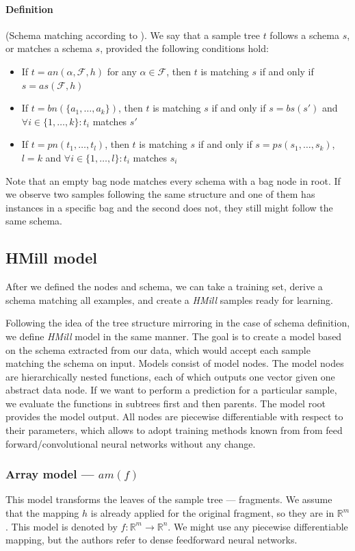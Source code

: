 \paragraph{Definition} (Schema matching according to \cite{Mandlik2020}). We say that a sample tree $t$ follows a schema $s$, or matches a schema $s$, provided the following conditions hold:
\begin{itemize}
    \itemsep0em 
    \item If $t=an(\alpha,\mathcal{F},h)$ for any $\alpha\in\mathcal{F}$, then $t$ is matching $s$ if and only if $s=as(\mathcal{F},h)$
    \item If $t=bn(\{a_1,\dots,a_k\})$, then $t$ is matching $s$ if and only if $s=bs(s')$ and $\forall i\in\{1,\dots,k\}:t_i$ matches $s'$
    \item If $t=pn(t_1,\dots,t_l)$, then $t$ is matching $s$ if and only if $s=ps(s_1,\dots,s_k)$,$l=k$ and $\forall i\in\{1,\dots,l\}:t_i$ matches $s_i$
\end{itemize}

Note that an empty bag node matches every schema with a bag node in root. If we observe two samples following the same structure and one of them has instances in a specific bag and the second does not, they still might follow the same schema.

\subsection{HMill model}
After we defined the nodes and schema, we can take a training set, derive a schema matching all examples, and create a \emph{HMill} samples ready for learning. 

Following the idea of the tree structure mirroring in the case of schema definition, we define \emph{HMill} model in the same manner. The goal is to create a model based on the schema extracted from our data, which would accept each sample matching the schema on input. Models consist of model nodes. The model nodes are hierarchically nested functions, each of which outputs one vector given one abstract data node. If we want to perform a prediction for a particular sample, we evaluate the functions in subtrees first and then parents. The model root provides the model output. All nodes are piecewise differentiable with respect to their parameters, which allows to adopt training methods known from from feed forward/convolutional neural networks without any change.

\subsubsection{Array model --- $am(f)$}
This model transforms the leaves of the sample tree --- fragments. We assume that the mapping $h$ is already applied for the original fragment, so they are in $\mathbb{R}^m$.  This model is denoted by $f:\mathbb{R}^m\rightarrow\mathbb{R}^n$. We might use any piecewise differentiable mapping, but the authors refer to dense feedforward neural networks.

